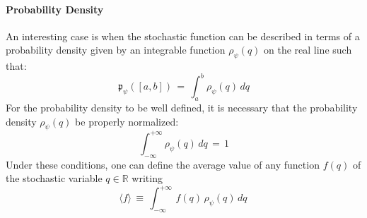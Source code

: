 \documentclass[10pt,a4paper]{article}
\begin{document}
\paragraph{\sc Probability Density}
An interesting case is when the stochastic function can be described in terms of a probability density given by an integrable function $\rho_\psi(q)$ on the real line such that:
\begin{equation}\label{coriaceo}
    \mathfrak{p}_\psi\left(\left[a,b\right]\right) \, =
    \,\int_{a}^{b} \rho_\psi(q) \,dq
\end{equation}
For the probability density to be well defined, it is necessary that the probability density
$\rho_\psi(q)$ be properly normalized:
\begin{equation}\label{ranierus}
    \int_{-\infty}^{+\infty} \rho_\psi(q) \,dq \, = \, 1
\end{equation}
Under these conditions, one can define the average value of any function $f(q)$ of the  stochastic variable $q \in
\mathbb{R}$ writing
\begin{equation}\label{romildo}
    \langle f\rangle \, \equiv \,  \int_{-\infty}^{+\infty}\, f(q)\, \rho_\psi(q) \,dq \,
\end{equation}
\end{document}
